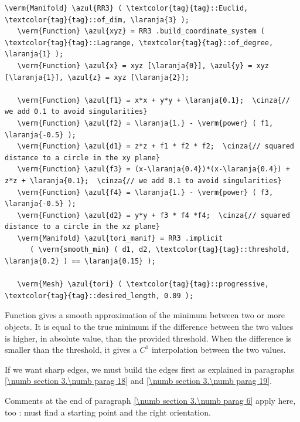 \begin{Verbatim}[commandchars=\\\{\},formatcom=\small\tt,frame=single,
   label=parag-\ref{\numb section 3.\numb parag 7}.cpp,rulecolor=\color{coment},
   baselinestretch=0.94,framesep=2mm                                            ]
   \verm{Manifold} \azul{RR3} ( \textcolor{tag}{tag}::Euclid, \textcolor{tag}{tag}::of_dim, \laranja{3} );
   \verm{Function} \azul{xyz} = RR3 .build_coordinate_system ( \textcolor{tag}{tag}::Lagrange, \textcolor{tag}{tag}::of_degree, \laranja{1} );
   \verm{Function} \azul{x} = xyz [\laranja{0}], \azul{y} = xyz [\laranja{1}], \azul{z} = xyz [\laranja{2}];

   \verm{Function} \azul{f1} = x*x + y*y + \laranja{0.1};  \cinza{// we add 0.1 to avoid singularities}
   \verm{Function} \azul{f2} = \laranja{1.} - \verm{power} ( f1, \laranja{-0.5} );
   \verm{Function} \azul{d1} = z*z + f1 * f2 * f2;  \cinza{// squared distance to a circle in the xy plane}
   \verm{Function} \azul{f3} = (x-\laranja{0.4})*(x-\laranja{0.4}) + z*z + \laranja{0.1};  \cinza{// we add 0.1 to avoid singularities}
   \verm{Function} \azul{f4} = \laranja{1.} - \verm{power} ( f3, \laranja{-0.5} );
   \verm{Function} \azul{d2} = y*y + f3 * f4 *f4;  \cinza{// squared distance to a circle in the xz plane}
   \verm{Manifold} \azul{tori_manif} = RR3 .implicit
      ( \verm{smooth_min} ( d1, d2, \textcolor{tag}{tag}::threshold, \laranja{0.2} ) == \laranja{0.15} );

   \verm{Mesh} \azul{tori} ( \textcolor{tag}{tag}::progressive, \textcolor{tag}{tag}::desired_length, 0.09 );
\end{Verbatim}

Function {\small\tt {}} gives a smooth approximation of the minimum between
two or more {\small\tt {}} objects.
It is equal to the true minimum if the difference between the two values is higher, in
absolute value, than the provided threshold.
When the difference is smaller than the threshold, it gives a $ C^1 $ interpolation between
the two values.

If we want sharp edges, we must build the edges first as explained in paragraphs
\ref{\numb section 3.\numb parag 18} and \ref{\numb section 3.\numb parag 19}.

Comments at the end of paragraph \ref{\numb section 3.\numb parag 6} apply here, too :
{\maniFEM} must find a starting point and the right orientation.


\section{~~\cinza{[empty]}}\label{\numb section 3.\numb parag 8}


